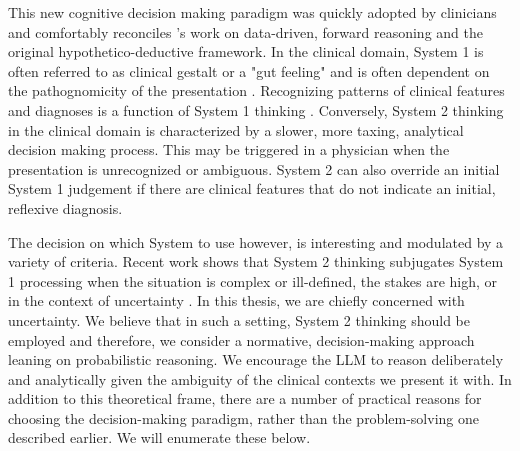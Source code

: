 This new cognitive decision making paradigm was quickly adopted by clinicians and comfortably reconciles \citet{patelKnowledgeBasedSolution1986}'s work on data-driven, forward reasoning and the original hypothetico-deductive framework. In the clinical domain, System 1 is often referred to as clinical gestalt or a "gut feeling" and is often dependent on the pathognomicity of the presentation \citep{croskerryUniversalModelDiagnostic2009}. Recognizing patterns of clinical features and diagnoses is a function of System 1 thinking \citep{groenMedicalProblemsolvingQuestionable1985, blois1984information}. Conversely, System 2 thinking in the clinical domain is characterized by a slower, more taxing, analytical decision making process. This may be triggered in a physician when the presentation is unrecognized or ambiguous. System 2 can also override an initial System 1 judgement if there are clinical features that do not indicate an initial, reflexive diagnosis.

The decision on which System to use however, is interesting and modulated by a variety of criteria. Recent work shows that System 2 thinking subjugates System 1 processing when the situation is complex or ill-defined, the stakes are high, or in the context of uncertainty \citep{croskerryCriticalThinkingReasoning, moultonSlowingWhenYou2007}. In this thesis, we are chiefly concerned with uncertainty. We believe that in such a setting, System 2 thinking should be employed and therefore, we consider a normative, decision-making approach leaning on probabilistic reasoning. We encourage the LLM to reason deliberately and analytically given the ambiguity of the clinical contexts we present it with. In addition to this theoretical frame, there are a number of practical reasons for choosing the decision-making paradigm, rather than the problem-solving one described earlier. We will enumerate these below. 

